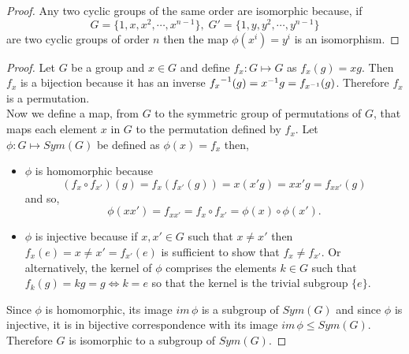\documentclass[MathsNotesBase.tex]{subfiles}
\begin{document}
{		
		
		\begin{proof}
			Any two cyclic groups of the same order are isomorphic because, if
			\[ G = \{1, x, x^2, \cdots, x^{n-1}\}, \; G' = \{1, y, y^2, \cdots, y^{n-1}\} \]
			are two cyclic groups of order $n$ then the map $\phi(x^i) = y^i$ is an isomorphism.
		\end{proof}
	
		\medskip
		\begin{proof}
			Let $G$ be a group and ${ x \in G }$ and define ${ f_x : G \longmapsto G }$ as ${ f_x(g) = xg }$. Then $f_x$ is a bijection because it has an inverse ${ {f_x}^{-1}(g) = {x}^{-1}g = f_{{x}^{-1}}(g) }$. Therefore $f_x$ is a permutation.\\
			
			Now we define a map, from $G$ to the symmetric group of permutations of $G$, that maps each element $x$ in $G$ to the permutation defined by $f_x$. Let ${ \phi: G \longmapsto Sym(G) }$ be defined as ${ \phi(x) = f_x }$ then,
			\begin{itemize}
				\item{$\phi$ is homomorphic because
					\[ (f_x \circ f_{x'})(g) = f_x(f_{x'}(g)) = x(x'g) = xx'g = f_{xx'}(g) \]
					and so,
					\[ \phi(xx') = f_{xx'} = f_x \circ f_{x'} = \phi(x) \circ \phi(x'). \]
				}
				\item{$\phi$ is injective because if ${ x,x' \in G }$ such that ${ x \neq x' }$ then ${ f_x(e) = x \neq x' = f_{x'}(e) }$ is sufficient to show that ${ f_x \neq f_{x'} }$. Or alternatively, the kernel of $\phi$ comprises the elements ${ k \in G }$ such that ${ f_k(g) = kg = g \iff k = e }$ so that the kernel is the trivial subgroup ${ \{e\} }$.
				}
			\end{itemize}
			Since $\phi$ is homomorphic, its image ${ im\,\phi }$ is a subgroup of ${ Sym(G) }$ and since $\phi$ is injective, it is in bijective correspondence with its image ${ im\,\phi \leq Sym(G) }$.\\
			Therefore $G$ is isomorphic to a subgroup of $Sym(G)$.
		\end{proof}
		
}
\end{document}
